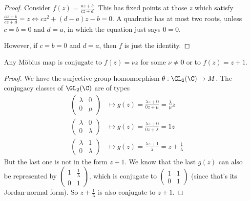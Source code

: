 \documentclass[a4paper]{article}
\begin{document}
\begin{proof}
  Consider $f(z) = \frac{az + b}{cz + d}$. This has fixed points at those $z$ which satisfy $\frac{az + b}{cz + d} = z \Leftrightarrow cz^2 + (d - a)z - b = 0$. A quadratic has at most two roots, unless $c = b = 0$ and $d = a$, in which the equation just says $0 = 0$.

  However, if $c = b= 0$ and $d = a$, then $f$ is just the identity.
\end{proof}

\begin{prop}
  Any M\"obius map is conjugate to $f(z) = \nu z$ for some $\nu\not= 0$ or to $f(z) = z + 1$.
\end{prop}

\begin{proof}
  We have the surjective group homomorphism $\theta: \GL_2(\C) \to M$. The conjugacy classes of $\GL_2(\C)$ are of types
  \begin{align*}
    \begin{pmatrix}
      \lambda & 0\\
      0 & \mu
    \end{pmatrix} &\mapsto g(z) = \frac{\lambda z + 0}{0z + \mu} = \frac{\lambda}{\mu}z\\
    \begin{pmatrix}
      \lambda & 0\\
      0 & \lambda
    \end{pmatrix} &\mapsto g(z) = \frac{\lambda z + 0}{0z + \lambda} = 1 z\\
    \begin{pmatrix}
      \lambda & 1\\
      0 & \lambda
    \end{pmatrix} &\mapsto g(z) = \frac{\lambda z + 1}{\lambda} = z + \frac{1}{\lambda}
  \end{align*}
  But the last one is not in the form $z + 1$. We know that the last $g(z)$ can also be represented by $
  \begin{pmatrix}
    1 & \frac{1}{\lambda}\\
    0 & 1
  \end{pmatrix}$, which is conjugate to $
  \begin{pmatrix}
    1 & 1\\
    0 & 1
  \end{pmatrix}$ (since that's its Jordan-normal form). So $z + \frac{1}{\lambda}$ is also conjugate to $z + 1$.
\end{proof}
\end{document}
